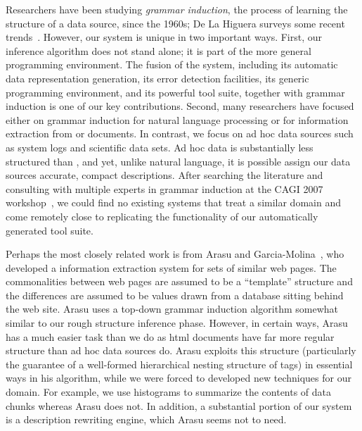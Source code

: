Researchers have been studying {\em grammar induction}, the process of
learning the structure of a data source, since the 1960s; De La Higuera
surveys some recent trends~\cite{higuera01current}.  However,
our system is unique in two important ways.  First, our inference
algorithm does not stand alone; it is part of the more general \pads{}
programming environment.  The fusion of the
\pads{} system, including its automatic data representation generation,
its error detection facilities, its generic programming environment, 
and its powerful tool suite, together with grammar induction
is one of our key contributions.  Second, many researchers have
focused either on grammar induction for natural language processing or
for information extraction from \xml{} or \html{} documents.  In
contrast, we focus on ad hoc data sources such as system logs and
scientific data sets. Ad hoc data is substantially less
structured than \xml{}, and yet, unlike natural language, it is
possible assign our data sources accurate, compact descriptions.  After 
searching the literature and consulting
with multiple experts in grammar induction at the CAGI 2007 
workshop~\cite{}, we could find no existing 
systems that treat a similar domain and come remotely close to
replicating the functionality of our automatically generated tool suite.


Perhaps the most closely related work is from Arasu and 
Garcia-Molina~\cite{arasu+:sigmod03}, who developed a information
extraction system for sets of similar web pages.  The
commonalities between web pages are assumed to be a ``template'' structure
and the differences are assumed to be values drawn from a database
sitting behind the web site.  Arasu uses a top-down grammar induction
algorithm somewhat similar to our rough structure inference phase.  
However, in certain ways, Arasu has a much easier task than we do as html
documents have far more regular structure than ad hoc data sources do.
Arasu exploits this structure (particularly the guarantee of a well-formed
hierarchical nesting structure of \xml{} tags) in essential ways in his 
algorithm,
while we were forced to developed new techniques for our domain.  For example,
we use histograms to summarize the contents of data chunks whereas
Arasu does not.  In addition, a substantial portion of our system
is a description rewriting engine, which Arasu seems not to need.  

